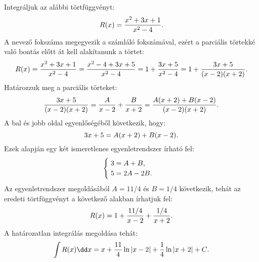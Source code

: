 \begin{example}
  Integráljuk az alábbi törtfüggvényt:
  \[
    R(x) = \frac{x^2 + 3x + 1}{x^2 - 4}
    \text.
  \]
  A nevező fokszáma megegyezik a számláló fokszámával, ezért a parciális
  törtekké való bontás előtt át kell alakítanunk a törtet:
  \[
    R(x)
    = \frac{x^2 + 3x + 1}{x^2 - 4}
    = \frac{x^2 - 4 + 3x + 5}{x^2 - 4}
    = 1 + \frac{3x + 5}{x^2 - 4}
    = 1 + \frac{3x + 5}{(x - 2)(x + 2)}
    \text.
  \]
  Határozzuk meg a parciális törteket:
  \[
    \frac{3x + 5}{(x - 2)(x + 2)}
    = \frac{A}{x - 2} + \frac{B}{x + 2}
    = \frac{A(x + 2) + B(x - 2)}{(x - 2)(x + 2)}
    \text.
  \]
  A bal és jobb oldal egyenlőségéből következik, hogy:
  \[
    3x + 5 = A(x + 2) + B(x - 2)
    \text.
  \]
  Ezek alapján egy két ismeretlenes egyenletrendszer írható fel:
  \[
    \begin{cases}
      \;3 = A + B \text, \\
      \;5 = 2A - 2B \text.
    \end{cases}
  \]
  Az egyenletrendszer megoldásából $A = 11/4$ és $B = 1/4$ következik, tehát az
  eredeti törtfüggvényt a következő alakban írhatjuk fel:
  \[
    R(x) = 1 + \frac{11/4}{x - 2} + \frac{1/4}{x + 2}
    \text.
  \]
  A határozatlan integrálás megoldása tehát:
  \[
    \int R(x) \dd x
    = x + \frac{11}{4} \ln |x - 2| + \frac{1}{4} \ln |x + 2| + C
    \text.
  \]
\end{example}

